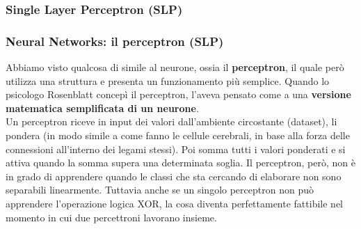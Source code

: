 \subsubsection[Single Layer Perceptron (SLP)]{Single Layer Perceptron (SLP)}
\begin{frame}

	\frametitle{Neural Networks: il perceptron (SLP)}

	Abbiamo visto qualcosa di simile al neurone, ossia il \textbf{perceptron}, il quale però utilizza una struttura e presenta un funzionamento più semplice.
	\newlinedouble
	Quando lo psicologo Rosenblatt concepì il perceptron, l'aveva pensato come a una \textbf{versione matematica semplificata di un neurone}.\\
	Un perceptron riceve in input dei valori dall'ambiente circostante (dataset), li pondera (in modo simile a come fanno le cellule cerebrali, in base alla forza delle connessioni all'interno dei legami stessi). Poi somma tutti i valori ponderati e si attiva quando la somma supera una determinata soglia.
	\newlinedouble
	Il perceptron, però, non è in grado di apprendere quando le classi che sta cercando di elaborare non sono separabili linearmente. Tuttavia anche se un singolo perceptron non può apprendere l'operazione logica XOR, la cosa diventa perfettamente fattibile nel momento in cui due percettroni lavorano insieme.
\end{frame}


